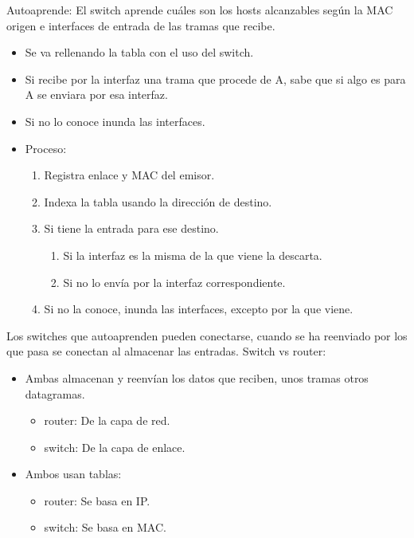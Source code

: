 \documentclass[12pt, twoside, openright]{report} %
\begin{document}
  Autoaprende: El switch aprende cuáles son los hosts alcanzables
  según la MAC origen e interfaces de entrada de las tramas que
  recibe.

    \begin{itemize}
      \item
        Se va rellenando la tabla con el uso del switch.
      \item
        Si recibe por la interfaz una trama que procede de A, sabe que
        si algo es para A se enviara por esa interfaz.
      \item
        Si no lo conoce inunda las interfaces.
      \item
        Proceso:

      \begin{enumerate}
        \item
          Registra enlace y MAC del emisor.
        \item
          Indexa la tabla usando la dirección de destino.
        \item
          Si tiene la entrada para ese destino.

          \begin{enumerate}
            \item
              Si la interfaz es la misma de la que viene la descarta.
            \item
              Si no lo envía por la interfaz correspondiente.
          \end{enumerate}
        \item
          Si no la conoce, inunda las interfaces, excepto por la que
          viene.
      \end{enumerate}
    \end{itemize}

  Los switches que autoaprenden pueden conectarse, cuando se ha
  reenviado por los que pasa se conectan al almacenar las entradas.
  Switch vs router:

  \begin{itemize}
    \item
      Ambas almacenan y reenvían los datos que reciben, unos tramas
      otros datagramas.

      \begin{itemize}
        \item
          router: De la capa de red.
        \item
          switch: De la capa de enlace.
      \end{itemize}
    \item
      Ambos usan tablas:

      \begin{itemize}
        \item
          router: Se basa en IP.
        \item
          switch: Se basa en MAC.
      \end{itemize}
  \end{itemize}
  \pagebreak
\end{document}
